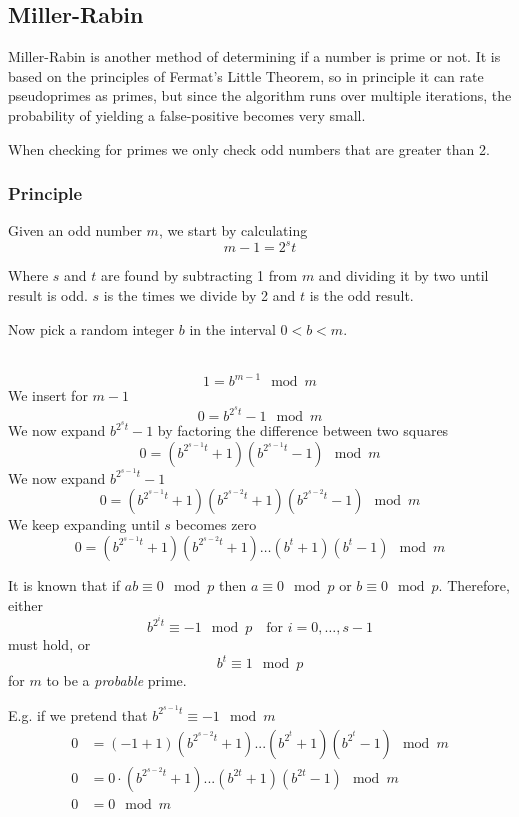 \subsection{Miller-Rabin}
Miller-Rabin is another method of determining if a number is prime or
not. It is based on the principles of Fermat's Little Theorem, so in
principle it can rate pseudoprimes as primes, but since the algorithm
runs over multiple iterations, the probability of yielding a
false-positive becomes very small.

When checking for primes we only check odd numbers that are greater
than 2.

\subsubsection*{Principle}
Given an odd number $m$, we start by calculating
\[ m - 1 =2^s t \]

Where $s$ and $t$ are found by subtracting 1 from $m$ and dividing it
by two until result is odd. $s$ is the times we divide by 2 and $t$ is
the odd result.

Now pick a random integer $b$ in the interval $0<b<m$.

 \notag\\
\[ 1 = b^{m-1} \mod m \]
We insert for $m-1$
\[ 0 = b^{2^{s}t}-1\mod m \]
We now expand $b^{2^{s}t} - 1$ by factoring the difference between two squares
\[ 0 = (b^{2^{s-1}t} + 1)(b^{2^{s-1}t} - 1) \mod m \]
We now expand $b^{2^{s-1}t}-1$
\[ 0 = (b^{2^{s-1}t} + 1)(b^{2^{s-2}t} + 1)(b^{2^{s-2}t} - 1) \mod m \]
We keep expanding until $s$ becomes zero
\[ 0 = (b^{2^{s-1}t} + 1)(b^{2^{s-2}t} + 1) \ldots (b^{t} + 1)(b^{t} - 1) \mod m \]

It is known that if $ab \equiv 0 \mod p$ then $a \equiv 0
\mod p$ or $b \equiv 0 \mod p$. Therefore, either
\[ b^{2^{i}t} \equiv -1 \mod p \quad \text{for } i = 0, \ldots, s-1 \]
must hold, or
\[ b^t \equiv 1 \mod p \]
for $m$ to be a \emph{probable} prime.

E.g. if we pretend that $b^{2^{s-1}t} \equiv -1 \mod m$
\begin{align*}
  0 &= (-1+1)(b^{2^{s-2}t}+1)...(b^{2^t}+1)(b^{2^t} - 1) \mod m \\
  0 &= 0 \cdot (b^{2^{s-2}t}+1)...(b^{2t}+1)(b^{2t} - 1) \mod m \\
  0 &= 0 \mod m \\
\end{align*}

